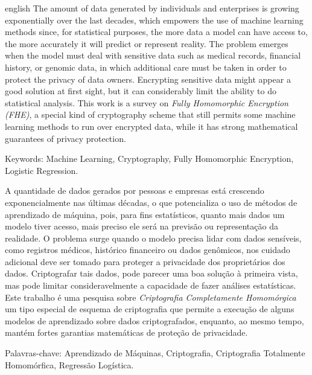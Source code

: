 \setlength{\absparsep}{18pt} 

\begin{resumo}[Abstract]
 \begin{otherlanguage*}{english}
 The amount of data generated by individuals and enterprises is growing exponentially over the last decades, which empowers the use of machine learning methods since, for statistical purposes, the more data a model can have access to, the more accurately it will predict or represent reality. The problem emerges when the model must deal with sensitive data such as medical records, financial history, or genomic data, in which additional care must be taken in order to protect the privacy of data owners. Encrypting sensitive data might appear a good solution at first sight, but it can considerably limit the ability to do statistical analysis. This work is a survey on \textit{Fully Homomorphic Encryption (FHE)}, a special kind of cryptography scheme that still permits some machine learning methods to run over encrypted data, while it has strong mathematical guarantees of privacy protection.  
 \end{otherlanguage*}

 Keywords: Machine Learning, Cryptography, Fully Homomorphic Encryption, Logistic Regression.
\end{resumo}

\begin{resumo}[Resumo]
    A quantidade de dados gerados por pessoas e empresas está crescendo exponencialmente nas últimas décadas, o que potencializa o uso de métodos de aprendizado de máquina, pois, para fins estatísticos, quanto mais dados um modelo tiver acesso, mais preciso ele será na previsão ou representação da realidade. O problema surge quando o modelo precisa lidar com dados sensíveis, como registros médicos, histórico financeiro ou dados genômicos, nos cuidado adicional deve ser tomado para proteger a privacidade dos proprietários dos dados. Criptografar tais dados, pode parecer uma boa solução à primeira vista, mas pode limitar consideravelmente a capacidade de fazer análises estatísticas. Este trabalho é uma pesquisa sobre \textit{Criptografia Completamente Homomórgica} um tipo especial de esquema de criptografia que permite a execução de alguns modelos de aprendizado sobre dados criptografados, enquanto, ao mesmo tempo, mantém fortes garantias matemáticas de proteção de privacidade.
    
    Palavras-chave: Aprendizado de Máquinas, Criptografia, Criptografia Totalmente Homomórfica, Regressão Logística.
\end{resumo}
